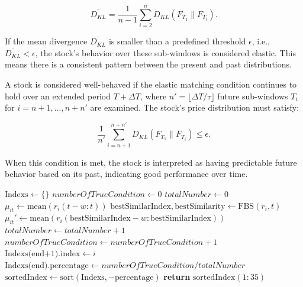 \documentclass[preprint,12pt,authoryear]{elsarticle}
\begin{document}
\begin{equation}\label{eq:D_KL}
    \overline{D_{KL}} = \frac{1}{n-1} \sum_{i=2}^{n} D_{KL}(F_{T_1} \parallel F_{T_i}).
\end{equation}

If the mean divergence \( \overline{D_{KL}} \) is smaller than a predefined threshold \( \epsilon \), i.e., \( \overline{D_{KL}} < \epsilon \), the stock's behavior over these sub-windows is considered elastic. This means there is a consistent pattern between the present and past distributions.

A stock is considered well-behaved if the elastic matching condition continues to hold over an extended period \( T + \Delta T \), where \( n' = \lfloor \Delta T / \tau \rfloor \) future sub-windows \( T_i \) for \( i = n+1, \dots, n+n' \) are examined. The stock's price distribution must satisfy:

\begin{equation}\label{eq:wel}
    \frac{1}{n'} \sum_{i=n+1}^{n+n'} D_{KL}(F_{T_1} \parallel F_{T_i}) \leq \epsilon.
\end{equation}

When this condition is met, the stock is interpreted as having predictable future behavior based on its past, indicating good performance over time.

\begin{algorithm}
\caption{The pseudocode to find the top 35 well-behaved stocks}
\label{alg:pseudocode}
\begin{algorithmic}
\State $\text{Indexs} \gets \{\}$
\State $numberOfTrueCondition \gets 0$
\State $totalNumber \gets 0$
\State $\mu_{it} \gets \text{mean}(r_i(t-w:t))$
\State $\text{bestSimilarIndex}, \text{bestSimilarity} \gets \text{FBS}(r_i,t)$
\State $\mu_{it}' \gets \text{mean}(r_i(\text{bestSimilarIndex}-w:\text{bestSimilarIndex}))$
\State $totalNumber \gets totalNumber + 1$
\State $numberOfTrueCondition \gets numberOfTrueCondition + 1$
\EndIf
\EndIf
\EndFor
\State $\text{Indexs(end+1)}.\text{index} \gets i$
\State $\text{Indexs(end)}.\text{percentage} \gets numberOfTrueCondition/totalNumber$
\EndFor
\State $\text{sortedIndex} \gets \text{sort}(\text{Indexs}, -\text{percentage})$
\State \textbf{return} $\text{sortedIndex}(1 : 35)$
\end{algorithmic}
\end{algorithm}
\end{document}
